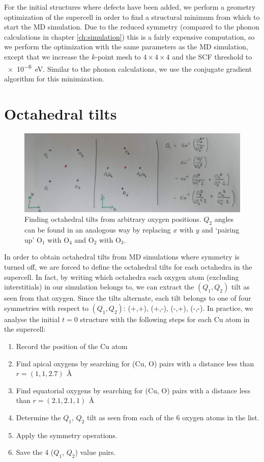 For the initial structures where defects have been added, we perform a geometry optimization of the supercell in order to find a structural minimum from which to start the MD simulation. Due to the reduced symmetry (compared to the phonon calculations in chapter \ref{ch:simulation}) this is a fairly expensive computation, so we perform the optimization with the same parameters as the MD simulation, except that we increase the $k$-point mesh to $4 \times 4 \times 4$ and the SCF threshold to \SI{e-6}{\eV}. Similar to the phonon calculations, we use the conjugate gradient algorithm for this minimization.

\section{Octahedral tilts}\label{sec:md_tilts}
\begin{figure}
	\centering
	\includegraphics[width=\textwidth]{fig/md/octahedral_tilts_md.jpg}
	\caption[Finding octahedral tilts from arbitrary oxygen positions]{Finding octahedral tilts from arbitrary oxygen positions. $Q_2$ angles can be found in an analogous way by replacing $x$ with $y$ and `pairing up' O$_1$ with O$_4$ and O$_2$ with O$_3$.}
	\label{fig:md_octahedral_tilts}
\end{figure}

In order to obtain octahedral tilts from MD simulations where symmetry is turned off, we are forced to define the octahedral tilts for each octahedra in the supercell. In fact, by writing which octahedra each oxygen atom (excluding interstitials) in our simulation belongs to, we can extract the $(Q_1,Q_2)$ tilt as seen from that oxygen. Since the tilts alternate, each tilt belongs to one of four symmetries with respect to $(Q_1,Q_2)$: (+,+), (+,-), (-,+), (-,-). In practice, we analyse the initial $t=0$ structure with the following steps for each Cu atom in the supercell:

\begin{enumerate}
	\item Record the position of the Cu atom
	\item Find apical oxygens by searching for (Cu, O) pairs with a distance less than $r = (1,1,2.7) \, \SI{}{\angstrom}$
	\item Find equatorial oxygens by searching for (Cu, O) pairs with a distance less than $r = (2.1,2.1,1) \, \SI{}{\angstrom}$
	\item Determine the $Q_1$, $Q_2$ tilt as seen from each of the 6 oxygen atoms in the list.
	\item Apply the symmetry operations.
	\item Save the 4 ($Q_1$, $Q_2$) value pairs.
\end{enumerate}

